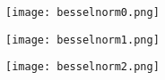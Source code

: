 \texttt{[image: besselnorm0.png]}

\texttt{[image: besselnorm1.png]}

\texttt{[image: besselnorm2.png]}

